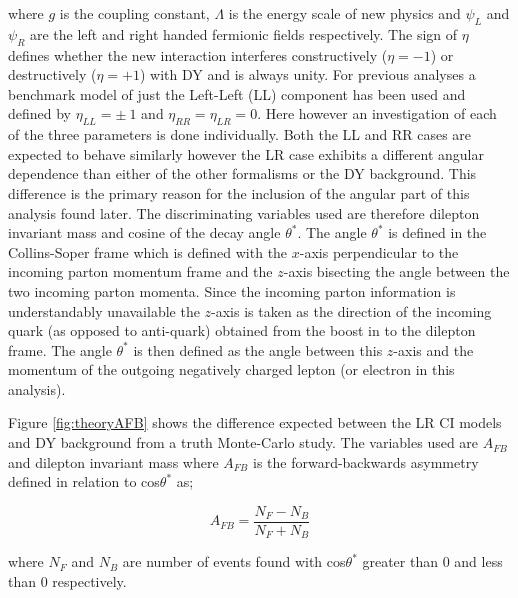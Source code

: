         where $g$ is the coupling constant, $\Lambda$ is the energy scale of new physics and $\psi_{L}$ and $\psi_{R}$ are the left and right handed fermionic fields respectively. The sign of $\eta$ defines whether the new interaction interferes constructively ($\eta = -1$) or destructively ($\eta = +1$) with DY and is always unity. For previous analyses \cite{PhysRevLett.103.191803,PhysRevLett.96.211801,PhysRevD.87.015010} a benchmark model of just the Left-Left (LL) component has been used and defined by $\eta_{LL} = \pm~1$ and $\eta_{RR} = \eta_{LR} = 0$. Here however an investigation of each of the three parameters is done individually. Both the LL and RR cases are expected to behave similarly however the LR case exhibits a different angular dependence than either of the other formalisms or the DY background. This difference is the primary reason for the inclusion of the angular part of this analysis found later. The discriminating variables used are therefore dilepton invariant mass and cosine of the decay angle $\theta^{*}$. The angle $\theta^{*}$ is defined in the Collins-Soper frame \cite{PhysRevD.16.2219} which is defined with the $x$-axis perpendicular to the incoming parton momentum frame and the $z$-axis bisecting the angle between the two incoming parton momenta. Since the incoming parton information is understandably unavailable the $z$-axis is taken as the direction of the incoming quark (as opposed to anti-quark) obtained from the boost in to the dilepton frame. The angle $\theta^{*}$ is then defined as the angle between this $z$-axis and the momentum of the outgoing negatively charged lepton (or electron in this analysis).

        Figure \ref{fig:theoryAFB} shows the difference expected between the LR CI models and DY background from a truth Monte-Carlo study. The variables used are $A_{FB}$ and dilepton invariant mass where $A_{FB}$ is the forward-backwards asymmetry defined in relation to cos$\theta^{*}$ as;

        \begin{equation}
            A_{FB} = 
                \frac{N_{F} - N_{B}}{N_{F} + N_{B}}
            \label{eq:AFB}
        \end{equation}

        where $N_{F}$ and $N_{B}$ are number of events found with cos$\theta^{*}$ greater than 0 and less than 0 respectively.
        
